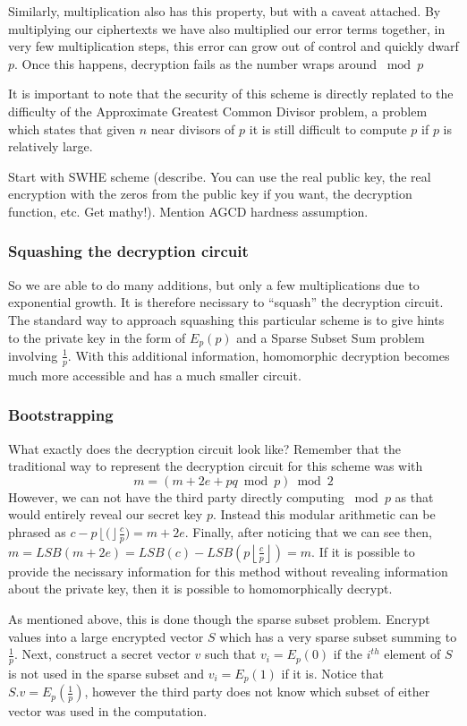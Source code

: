 \documentclass[letterpaper,twocolumn,10pt]{article}
\newcommand{\floor}[1]{\left\lfloor #1 \right\rfloor}
\begin{document}
Similarly, multiplication also has this property, but with a caveat attached. By multiplying our ciphertexts we have also multiplied our error terms together, in very few multiplication steps, this error can grow out of control and quickly dwarf $p$. Once this happens, decryption fails as the number wraps around $\bmod p$

It is important to note that the security of this scheme is directly replated to the difficulty of the Approximate Greatest Common Divisor problem, a problem which states that given $n$ near divisors of $p$ it is still difficult to compute $p$ if $p$ is relatively large.

Start with SWHE scheme (describe. You can use the real public key, the real encryption with the zeros from the public key if you want, the decryption function, etc. Get mathy!). Mention AGCD hardness assumption.

\subsubsection{Squashing the decryption circuit}
So we are able to do many additions, but only a few multiplications due to exponential growth. It is therefore necissary to ``squash'' the decryption circuit. The standard way to approach squashing this particular scheme is to give hints to the private key in the form of $E_p(p)$ and a Sparse Subset Sum problem involving $\frac{1}{p}$. With this additional information, homomorphic decryption becomes much more accessible and has a much smaller circuit.

\subsubsection{Bootstrapping}
What exactly does the decryption circuit look like? Remember that the traditional way to represent the decryption circuit for this scheme was with
$$m = (m + 2e + pq \bmod p) \bmod 2$$
However, we can not have the third party directly computing $\bmod p$ as that would entirely reveal our secret key $p$. Instead this modular arithmetic can be phrased as $c- p\floor(\frac{c}{p}) = m + 2e$. Finally, after noticing that we can see then, $m = LSB(m + 2e) = LSB(c) - LSB(p\floor{\frac{c}{p}}) = m$. If it is possible to provide the necissary information for this method without revealing information about the private key, then it is possible to homomorphically decrypt.

As mentioned above, this is done though the sparse subset problem. Encrypt values into a large encrypted vector $S$ which has a very sparse subset summing to $\frac{1}{p}$. Next, construct a secret vector $v$ such that $v_i = E_p(0)$ if the $i^{th}$ element of $S$ is not used in the sparse subset and $v_i = E_p(1)$ if it is. Notice that $S.v = E_p(\frac{1}{p})$, however the third party does not know which subset of either vector was used in the computation.
\end{document}
